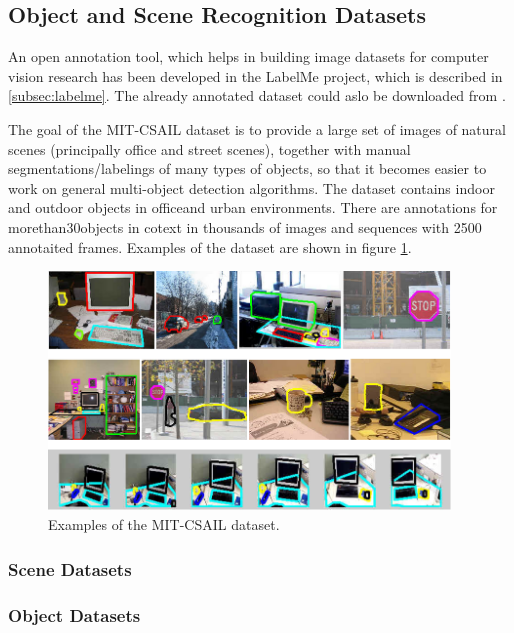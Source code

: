 \subsection{Object and Scene Recognition Datasets}

An open annotation tool, which helps in building image datasets for computer vision research has been developed in the LabelMe project, which is described in \ref{subsec:labelme}. The already annotated dataset could aslo be downloaded from \cite{labelme_db}.
 
The goal of the MIT-CSAIL dataset \cite{mit-csail_db} is to provide a large set of images of natural scenes (principally office and street scenes), together with manual segmentations/labelings of many types of objects, so that it becomes easier to work on general multi-object detection algorithms. The dataset contains indoor and outdoor objects in officeand urban environments. There are annotations for morethan30objects in cotext in thousands of images and sequences with 2500 annotaited frames. Examples of the dataset are shown in figure \ref{fig:mit-csail}.

\begin{figure}[H]
\begin{center}
\includegraphics[width=0.95\textwidth]{fig/MIT-CSAIL}
\end{center}
\caption{Examples of the MIT-CSAIL dataset.}
\label{fig:mit-csail}
\end{figure}

\subsubsection{Scene Datasets}
\subsubsection{Object Datasets}